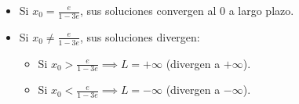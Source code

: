 \documentclass[12pt]{article}
\begin{document}
\begin{ejercicio}
\begin{enumerate}
\begin{itemize}
                    \item Si $x_0 = \displaystyle \frac{e}{1-3e}$, sus soluciones convergen al 0 a largo plazo.
                    \item Si $x_0 \neq \displaystyle \frac{e}{1-3e}$, sus soluciones divergen:
                    \begin{itemize}
                        \item Si $x_0 > \displaystyle \frac{e}{1-3e} \implies L = +\infty$ (divergen a $+\infty$).
                        \item Si $x_0 < \displaystyle \frac{e}{1-3e} \implies L = -\infty$ (divergen a $-\infty$).
                    \end{itemize}
                \end{itemize}
        \end{enumerate}
    \end{ejercicio}
\end{document}
